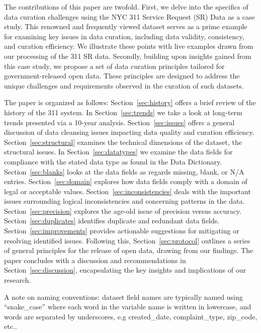 \documentclass[12pt, titlepage]{article}
\begin{document}
The contributions of this paper are twofold. First, we delve into
the specifics of data curation challenges using the NYC 311 Service
Request (SR) Data as a case study. This renowned and frequently viewed 
dataset serves as a prime example for examining key issues in data curation, 
including data validity, consistency, and curation efficiency. 
We illustrate these points with live examples drawn from our processing of the 311 SR data. 
Secondly, building upon insights gained from this case study, we 
propose a set of data curation principles tailored for government-released open data. 
These principles are designed to address the unique challenges 
and requirements observed in the curation of such datasets.

The paper is organized as follows:
Section~\ref{sec:history} offers a brief review of the history of the 311 system. In 
Section~\ref{sec:trends} we take a look at long-term trends presented via a 10-year analysis.
Section~\ref{sec:issues} offers a general discussion of data cleansing issues
impacting data quality and curation efficiency. Section~\ref{sec:structural} examines
the technical dimensions of the dataset, the structural issues. 
In Section~\ref{sec:datatypes} we examine the data fields for compliance 
with the stated data type as found in the Data Dictionary. Section~\ref{sec:blanks} looks
at the data fields as regards missing, blank, or N/A entries. Section~\ref{sec:domain} explores
how data fields comply with a domain of legal or acceptable values. Section~\ref{sec:inconsistencies}
deals with the important issues surrounding logical inconsistencies 
and concerning patterns in the data. Section~\ref{sec:precision} 
explores the age-old issue of precision versus accuracy. Section~\ref{sec:duplicates}
identifies duplicate and redundant data fields. Section~\ref{sec:improvements} provides 
actionable suggestions for mitigating or resolving identified issues. Following this, Section~\ref{sec:protocol} outlines a series of general 
principles for the release of open data, drawing from our findings. 
The paper concludes with a discussion and recommendations
in Section~\ref{sec:discussion}, encapsulating the key 
insights and implications of our research.

A note on naming conventions: dataset field names are typically 
named using ``snake\_case'' where each word in the 
variable name is written in lowercase, and 
words are separated by underscores, e.g 
created\_date, complaint\_type, zip\_code, etc..   
\end{document}
